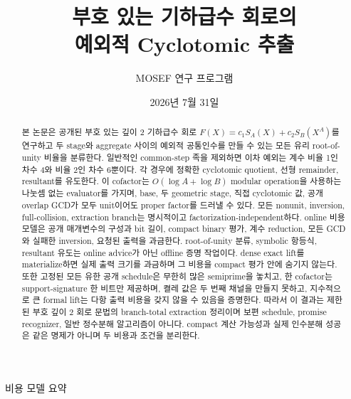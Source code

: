 \documentclass[11pt]{article}
\title{부호 있는 기하급수 회로의\\
예외적 Cyclotomic 추출}
\author{MOSEF 연구 프로그램}
\date{2026년 7월 31일}
\begin{document}
\maketitle

\begin{abstract}
본 논문은 공개된 부호 있는 깊이 2 기하급수 회로
\(F(X)=c_1S_A(X)+c_2S_B(X^A)\)를 연구하고 두 stage와 aggregate 사이의
예외적 공통인수를 만들 수 있는 모든 유리 root-of-unity 비율을
분류한다. 일반적인 common-step 족을 제외하면 이차 예외는 계수 비율
1인 차수 4와 비율 2인 차수 6뿐이다. 각 경우에 정확한 cyclotomic
quotient, 선형 remainder, resultant를 유도한다. 이 cofactor는
\(O(\log A+\log B)\) modular operation을 사용하는 나눗셈 없는
evaluator를 가지며, base, 두 geometric stage, 직접 cyclotomic 값,
공개 overlap GCD가 모두 unit이어도 proper factor를 드러낼 수 있다.
모든 nonunit, inversion, full-collision, extraction branch는 명시적이고
factorization-independent하다. online 비용 모델은 공개 매개변수의
구성과 bit 길이, compact binary 평가, 계수 reduction, 모든 GCD와 실패한
inversion, 요청된 출력을 과금한다. root-of-unity 분류, symbolic
항등식, resultant 유도는 online advice가 아닌 offline 증명 작업이다.
dense exact lift를 materialize하면 실제 출력 크기를 과금하며 그 비용을
compact 평가 안에 숨기지 않는다. 또한 고정된 모든 유한 공개 schedule은
무한히 많은 semiprime을 놓치고, 한 cofactor는 support-signature 한
비트만 제공하며, 켤레 값은 두 번째 채널을 만들지 못하고, 지수적으로
큰 formal lift는 다항 출력 비용을 갖지 않을 수 있음을 증명한다. 따라서
이 결과는 제한된 부호 깊이 2 회로 문법의 branch-total extraction
정리이며 보편 schedule, promise recognizer, 일반 정수분해 알고리즘이
아니다. compact 계산 가능성과 실제 인수분해 성공은 같은 명제가 아니며
두 비용과 조건을 분리한다.
\end{abstract}

\begin{costmodel}{비용 모델 요약}
\end{costmodel}
\end{document}
